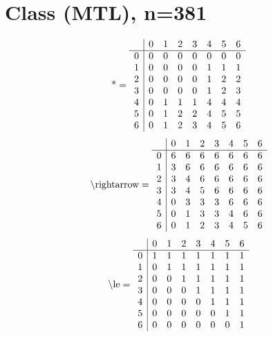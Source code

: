 \documentclass[11pt]{article}
\begin{document}
\section{Class (MTL), n=381}
\[\text{*} = 
\begin{array}{r | r r r r r r r}
 & 0 & 1 & 2 & 3 & 4 & 5 & 6 \\ \hline
0 & 0 & 0 & 0 & 0 & 0 & 0 & 0 \\
1 & 0 & 0 & 0 & 0 & 1 & 1 & 1 \\
2 & 0 & 0 & 0 & 0 & 1 & 2 & 2 \\
3 & 0 & 0 & 0 & 0 & 1 & 2 & 3 \\
4 & 0 & 1 & 1 & 1 & 4 & 4 & 4 \\
5 & 0 & 1 & 2 & 2 & 4 & 5 & 5 \\
6 & 0 & 1 & 2 & 3 & 4 & 5 & 6 \\
\end{array}
\]
\[\text{\textbackslash rightarrow} = 
\begin{array}{r | r r r r r r r}
 & 0 & 1 & 2 & 3 & 4 & 5 & 6 \\ \hline
0 & 6 & 6 & 6 & 6 & 6 & 6 & 6 \\
1 & 3 & 6 & 6 & 6 & 6 & 6 & 6 \\
2 & 3 & 4 & 6 & 6 & 6 & 6 & 6 \\
3 & 3 & 4 & 5 & 6 & 6 & 6 & 6 \\
4 & 0 & 3 & 3 & 3 & 6 & 6 & 6 \\
5 & 0 & 1 & 3 & 3 & 4 & 6 & 6 \\
6 & 0 & 1 & 2 & 3 & 4 & 5 & 6 \\
\end{array}
\]
\[\text{\textbackslash le} = 
\begin{array}{r | r r r r r r r}
 & 0 & 1 & 2 & 3 & 4 & 5 & 6 \\ \hline
0 & 1 & 1 & 1 & 1 & 1 & 1 & 1 \\
1 & 0 & 1 & 1 & 1 & 1 & 1 & 1 \\
2 & 0 & 0 & 1 & 1 & 1 & 1 & 1 \\
3 & 0 & 0 & 0 & 1 & 1 & 1 & 1 \\
4 & 0 & 0 & 0 & 0 & 1 & 1 & 1 \\
5 & 0 & 0 & 0 & 0 & 0 & 1 & 1 \\
6 & 0 & 0 & 0 & 0 & 0 & 0 & 1 \\
\end{array}
\]
\end{document}

